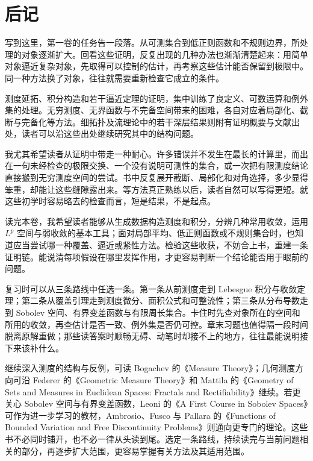 \chapter*{后记}

写到这里，第一卷的任务告一段落。从可测集合到低正则函数和不规则边界，所处理的对象逐渐扩大。回看这些证明，反复出现的几种办法也渐渐清楚起来：用简单对象逼近复杂对象，先取得可以控制的估计，再考察这些估计能否保留到极限中。同一种方法换了对象，往往就需要重新检查它成立的条件。

\ProseParagraphBreak

测度延拓、积分构造和若干逼近定理的证明，集中训练了良定义、可数运算和例外集的处理。无穷测度、无界函数与不完备空间带来的困难，各自对应着局部化、截断与完备化等方法。细拓扑及流理论中的若干深层结果则附有证明概要与文献出处，读者可以沿这些出处继续研究其中的结构问题。

\ProseParagraphBreak

我尤其希望读者从证明中带走一种耐心。许多错误并不发生在最长的计算里，而出在一句未经检查的极限交换、一个没有说明可测性的集合，或一次把有限测度结论直接搬到无穷测度空间的尝试。书中反复展开截断、局部化和对角选择，多少显得笨重，却能让这些缝隙露出来。等方法真正熟练以后，读者自然可以写得更短。就这些初学时容易略去的检查而言，短是结果，不是起点。

\ProseParagraphBreak

读完本卷，我希望读者能够从生成数据构造测度和积分，分辨几种常用收敛，运用 \(L^p\) 空间与弱收敛的基本工具；面对局部平均、低正则函数或不规则集合时，也知道应当尝试哪一种覆盖、逼近或紧性方法。检验这些收获，不妨合上书，重建一条证明链。能说清每项假设在哪里发挥作用，才更容易判断一个结论能否用于眼前的问题。

\ProseParagraphBreak

复习时可以从三条路线中任选一条。第一条从前测度走到 Lebesgue 积分与收敛定理；第二条从覆盖引理走到测度微分、面积公式和可整流性；第三条从分布导数走到 Sobolev 空间、有界变差函数与有限周长集合。卡住时先查对象所在的空间和所用的收敛，再查估计是否一致、例外集是否仍可控。章末习题也值得隔一段时间脱离原解重做；那些读答案时顺畅无碍、动笔时却接不上的地方，往往最能说明接下来该补什么。

\ProseParagraphBreak

继续深入测度的结构与反例，可读 Bogachev 的《Measure Theory》\cite{Bogachev2007Measure}；几何测度方向可沿 Federer 的《Geometric Measure Theory》\cite{Federer1996Geometric}和 Mattila 的《Geometry of Sets and Measures in Euclidean Spaces: Fractals and Rectifiability》\cite{Mattila1995Geometry}继续。若更关心 Sobolev 空间与有界变差函数，Leoni 的《A First Course in Sobolev Spaces》\cite{Leoni2017First}可作为进一步学习的教材，Ambrosio、Fusco 与 Pallara 的《Functions of Bounded Variation and Free Discontinuity Problems》\cite{Ambrosio2000Functions}则通向更专门的理论。这些书不必同时铺开，也不必一律从头读到尾。选定一条路线，持续读完与当前问题相关的部分，再逐步扩大范围，更容易掌握有关方法及其适用范围。

